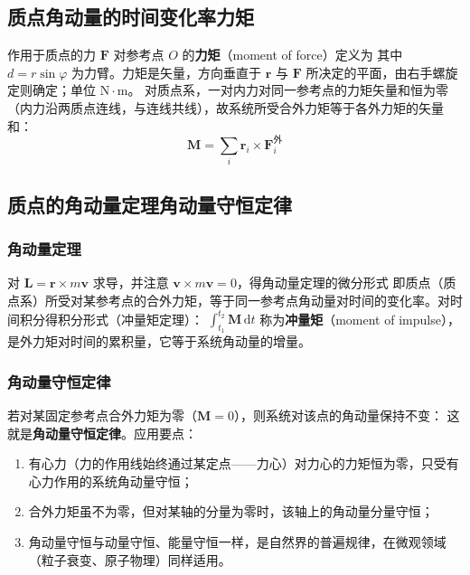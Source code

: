     \subsection{质点角动量的时间变化率\texorpdfstring{\hspace{0.5em}}{ }力矩}
    作用于质点的力 $\boldsymbol{F}$ 对参考点 $O$ 的\textbf{力矩}（moment of force）定义为
    其中 $d=r\sin\varphi$ 为力臂。力矩是矢量，方向垂直于 $\boldsymbol{r}$ 与 $\boldsymbol{F}$ 所决定的平面，由右手螺旋定则确定；单位 $\mathrm{N\cdot m}$。
    对质点系，一对内力对同一参考点的力矩矢量和恒为零（内力沿两质点连线，与连线共线），故系统所受合外力矩等于各外力矩的矢量和：
    \[
    \boldsymbol{M}=\sum_{i}\boldsymbol{r}_{i}\times\boldsymbol{F}_{i}^{\text{外}}
    \]

    \subsection{质点的角动量定理\texorpdfstring{\hspace{0.5em}}{ }角动量守恒定律}
        \subsubsection{角动量定理}
        对 $\boldsymbol{L}=\boldsymbol{r}\times m\boldsymbol{v}$ 求导，并注意 $\boldsymbol{v}\times m\boldsymbol{v}=0$，得角动量定理的微分形式
        即质点（质点系）所受对某参考点的合外力矩，等于同一参考点角动量对时间的变化率。对时间积分得积分形式（冲量矩定理）：
        $\displaystyle\int_{t_{1}}^{t_{2}}\boldsymbol{M}\,\mathrm{d}t$ 称为\textbf{冲量矩}（moment of impulse），是外力矩对时间的累积量，它等于系统角动量的增量。

        \subsubsection{角动量守恒定律}
        若对某固定参考点合外力矩为零（$\boldsymbol{M}=0$），则系统对该点的角动量保持不变：
        这就是\textbf{角动量守恒定律}。应用要点：
        \begin{enumerate}
            \item 有心力（力的作用线始终通过某定点——力心）对力心的力矩恒为零，只受有心力作用的系统角动量守恒；
            \item 合外力矩虽不为零，但对某轴的分量为零时，该轴上的角动量分量守恒；
            \item 角动量守恒与动量守恒、能量守恒一样，是自然界的普遍规律，在微观领域（粒子衰变、原子物理）同样适用。
        \end{enumerate}

